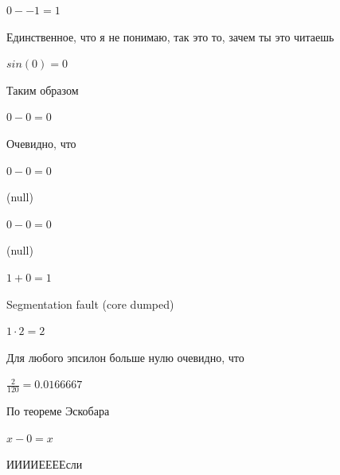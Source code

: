 \documentclass[12pt,a4paper,fleqn]{article}
\begin{document}
\begin{center}
\begin{center}
\begin{center}
\begin{center}
\begin{center}
\begin{center}
\begin{center}
\begin{center}
\begin{center}
\begin{center}
\begin{center}
\begin{center}
\begin{center}
\begin{center}
\begin{center}
\begin{center}
\begin{center}
\begin{center}
\begin{center}
\begin{center}
\begin{center}
\begin{center}
\begin{center}
\begin{center}
\begin{center}
\begin{center}
\begin{center}
\begin{center}
\begin{center}
\begin{center}
\begin{center}
\begin{center}
\begin{center}
\begin{center}
\begin{center}
\begin{center}
\begin{center}
\begin{center}$0--1 = 1$\end{center}
Единственное, что я не понимаю, так это то, зачем ты это читаешь

\begin{center}
\begin{center}$sin(0) = 0$\end{center}
Таким образом

\begin{center}
\begin{center}$0-0 = 0$\end{center}
Очевидно, что

\begin{center}
\begin{center}$0-0 = 0$\end{center}
(null)\cite{link4}

\begin{center}
\begin{center}$0-0 = 0$\end{center}
(null)\cite{link4}

\begin{center}
\begin{center}$1+0 = 1$\end{center}
Segmentation fault (core dumped)

\begin{center}
\begin{center}$1 \cdot 2 = 2$\end{center}
Для любого эпсилон больше нулю очевидно, что

\begin{center}
\begin{center}$\frac{2}{120} = 0.0166667$\end{center}
По теореме Эскобара

\begin{center}
$x-0 = x$\end{center}
ИИИИЕЕЕЕсли\cite{link3}


\end{center}
\end{center}
\end{center}
\end{center}
\end{center}
\end{center}
\end{center}
\end{center}
\end{center}
\end{center}
\end{center}
\end{center}
\end{center}
\end{center}
\end{center}
\end{center}
\end{center}
\end{center}
\end{center}
\end{center}
\end{center}
\end{center}
\end{center}
\end{center}
\end{center}
\end{center}
\end{center}
\end{center}
\end{center}
\end{center}
\end{center}
\end{center}
\end{center}
\end{center}
\end{center}
\end{center}
\end{center}
\end{center}
\end{center}
\end{center}
\end{center}
\end{center}
\end{center}
\end{center}
\end{document}
